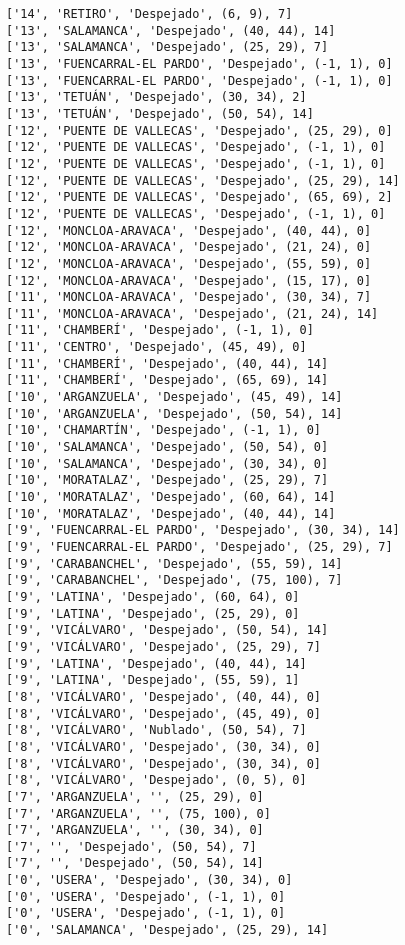 \documentclass[11pt]{article}
\begin{document}
\begin{Verbatim}[commandchars=\\\{\}]
['14', 'RETIRO', 'Despejado', (6, 9), 7]
['13', 'SALAMANCA', 'Despejado', (40, 44), 14]
['13', 'SALAMANCA', 'Despejado', (25, 29), 7]
['13', 'FUENCARRAL-EL PARDO', 'Despejado', (-1, 1), 0]
['13', 'FUENCARRAL-EL PARDO', 'Despejado', (-1, 1), 0]
['13', 'TETUÁN', 'Despejado', (30, 34), 2]
['13', 'TETUÁN', 'Despejado', (50, 54), 14]
['12', 'PUENTE DE VALLECAS', 'Despejado', (25, 29), 0]
['12', 'PUENTE DE VALLECAS', 'Despejado', (-1, 1), 0]
['12', 'PUENTE DE VALLECAS', 'Despejado', (-1, 1), 0]
['12', 'PUENTE DE VALLECAS', 'Despejado', (25, 29), 14]
['12', 'PUENTE DE VALLECAS', 'Despejado', (65, 69), 2]
['12', 'PUENTE DE VALLECAS', 'Despejado', (-1, 1), 0]
['12', 'MONCLOA-ARAVACA', 'Despejado', (40, 44), 0]
['12', 'MONCLOA-ARAVACA', 'Despejado', (21, 24), 0]
['12', 'MONCLOA-ARAVACA', 'Despejado', (55, 59), 0]
['12', 'MONCLOA-ARAVACA', 'Despejado', (15, 17), 0]
['11', 'MONCLOA-ARAVACA', 'Despejado', (30, 34), 7]
['11', 'MONCLOA-ARAVACA', 'Despejado', (21, 24), 14]
['11', 'CHAMBERÍ', 'Despejado', (-1, 1), 0]
['11', 'CENTRO', 'Despejado', (45, 49), 0]
['11', 'CHAMBERÍ', 'Despejado', (40, 44), 14]
['11', 'CHAMBERÍ', 'Despejado', (65, 69), 14]
['10', 'ARGANZUELA', 'Despejado', (45, 49), 14]
['10', 'ARGANZUELA', 'Despejado', (50, 54), 14]
['10', 'CHAMARTÍN', 'Despejado', (-1, 1), 0]
['10', 'SALAMANCA', 'Despejado', (50, 54), 0]
['10', 'SALAMANCA', 'Despejado', (30, 34), 0]
['10', 'MORATALAZ', 'Despejado', (25, 29), 7]
['10', 'MORATALAZ', 'Despejado', (60, 64), 14]
['10', 'MORATALAZ', 'Despejado', (40, 44), 14]
['9', 'FUENCARRAL-EL PARDO', 'Despejado', (30, 34), 14]
['9', 'FUENCARRAL-EL PARDO', 'Despejado', (25, 29), 7]
['9', 'CARABANCHEL', 'Despejado', (55, 59), 14]
['9', 'CARABANCHEL', 'Despejado', (75, 100), 7]
['9', 'LATINA', 'Despejado', (60, 64), 0]
['9', 'LATINA', 'Despejado', (25, 29), 0]
['9', 'VICÁLVARO', 'Despejado', (50, 54), 14]
['9', 'VICÁLVARO', 'Despejado', (25, 29), 7]
['9', 'LATINA', 'Despejado', (40, 44), 14]
['9', 'LATINA', 'Despejado', (55, 59), 1]
['8', 'VICÁLVARO', 'Despejado', (40, 44), 0]
['8', 'VICÁLVARO', 'Despejado', (45, 49), 0]
['8', 'VICÁLVARO', 'Nublado', (50, 54), 7]
['8', 'VICÁLVARO', 'Despejado', (30, 34), 0]
['8', 'VICÁLVARO', 'Despejado', (30, 34), 0]
['8', 'VICÁLVARO', 'Despejado', (0, 5), 0]
['7', 'ARGANZUELA', '', (25, 29), 0]
['7', 'ARGANZUELA', '', (75, 100), 0]
['7', 'ARGANZUELA', '', (30, 34), 0]
['7', '', 'Despejado', (50, 54), 7]
['7', '', 'Despejado', (50, 54), 14]
['0', 'USERA', 'Despejado', (30, 34), 0]
['0', 'USERA', 'Despejado', (-1, 1), 0]
['0', 'USERA', 'Despejado', (-1, 1), 0]
['0', 'SALAMANCA', 'Despejado', (25, 29), 14]

\end{Verbatim}
\end{document}

